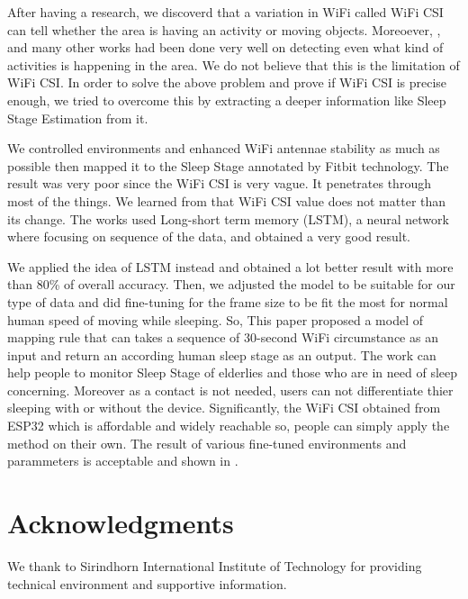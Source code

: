 \documentclass[10pt,letterpaper]{article}
\begin{document}
	After having a research, we discoverd that a variation in WiFi called WiFi CSI can tell whether the area is having an activity or moving objects. Moreoever, \cite{chowdhuryTZ}, \cite{zouH} and many other works had been done very well on detecting even what kind of activities is happening in the area. We do not believe that this is the limitation of WiFi CSI. In order to solve the above problem and prove if WiFi CSI is precise enough, we tried to overcome this by extracting a deeper information like Sleep Stage Estimation from it. 
	
	We controlled environments and enhanced WiFi antennae stability as much as possible then mapped it to the Sleep Stage annotated by Fitbit technology. The result was very poor since the WiFi CSI is very vague. It penetrates through most of the things. We learned from \cite{bib20} that WiFi CSI value does not matter than its change. The works used Long-short term memory (LSTM), a neural network where focusing on sequence of the data, and obtained a very good result.  
	
	We applied the idea of LSTM instead and obtained a lot better result with more than 80\% of overall accuracy. Then, we adjusted the model to be suitable for our type of data and did fine-tuning for the frame size to be fit the most for normal human speed of moving while sleeping. So, This paper proposed a model of mapping rule that can takes a sequence of 30-second WiFi circumstance as an input and return an according human sleep stage as an output. The work can help people to monitor Sleep Stage of elderlies and those who are in need of sleep concerning. Moreover as a contact is not needed, users can not differentiate thier sleeping with or without the device. Significantly, the WiFi CSI obtained from ESP32 which is affordable and widely reachable so, people can simply apply the method on their own. The result of various fine-tuned environments and parammeters is acceptable and shown in .
	
	
	\section*{Acknowledgments}
	We thank to Sirindhorn International Institute of Technology for providing technical environment and supportive information.
	
	
	
	\nolinenumbers
	
\end{document}
